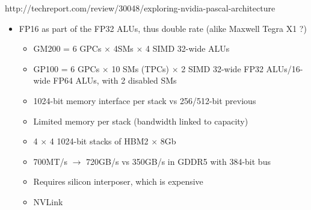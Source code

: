 http://techreport.com/review/30048/exploring-nvidia-pascal-architecture
\begin{itemize}
    \item FP16 as part of the FP32 ALUs, thus double rate (alike Maxwell Tegra X1 ?)
    \begin{itemize}
        \item GM200 = 6 GPCs $\times$  4SMs $\times$ 4 SIMD 32-wide ALUs
        \item GP100 = 6 GPCs $\times$ 10 SMs (TPCs) $\times$ 2 SIMD 32-wide FP32 ALUs/16-wide FP64 ALUs, with 2 disabled SMs
    \end{itemize}
    \begin{itemize}
        \item 1024-bit memory interface per stack vs 256/512-bit previous
        \item Limited memory per stack (bandwidth linked to capacity)
        \item 4 $\times$ 4 1024-bit stacks of HBM2 $\times$ 8Gb
        \item 700MT/s $\rightarrow$ 720GB/s vs 350GB/s in GDDR5 with 384-bit bus
        \item Requires silicon interposer, which is expensive
        \item NVLink
    \end{itemize}
\end{itemize}


%

% 
% 
